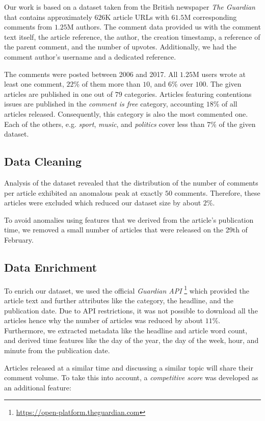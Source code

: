 Our work is based on a dataset taken from the British newspaper \textit{The Guardian} that contains approximately $626$K article URLs with $61.5$M corresponding comments from $1.25$M authors.
The comment data provided us with the comment text itself, the article reference, the author, the creation timestamp, a reference of the parent comment, and the number of upvotes. Additionally, we had the comment author's username and a dedicated reference.

The comments were posted between 2006 and 2017. All $1.25$M users wrote at least one comment, $22$\% of them more than $10$, and $6$\% over $100$.
The given articles are published in one out of $79$ categories. 
Articles featuring contentions issues are published in the \textit{comment is free} category, accounting $18$\% of all articles released.
Consequently, this category is also the most commented one. 
Each of the others, e.g. \textit{sport}, \textit{music}, and \textit{politics} cover less than $7$\% of the given dataset.

\subsection{Data Cleaning}
Analysis of the dataset revealed that the distribution of the number of comments per article exhibited an anomalous peak at exactly $50$ comments. 
Therefore, these articles were excluded which reduced our dataset size by about $2$\%.

To avoid anomalies using features that we derived from the article's publication time, we removed a small number of articles that were released on the 29th of February.

\subsection{Data Enrichment}
To enrich our dataset, we used the official \textit{Guardian API} \footnote{\url{https://open-platform.theguardian.com}} which provided the article text and further attributes like the category, the headline, and the publication date.
Due to API restrictions, it was not possible to download all the articles hence why the number of articles was reduced by about $11$\%.
Furthermore, we extracted metadata like the headline and article word count, and derived time features like the day of the year, the day of the week, hour, and minute from the publication date.

Articles released at a similar time and discussing a similar topic will share their comment volume. To take this into account, a \textit{competitive score} was developed as an additional feature:

